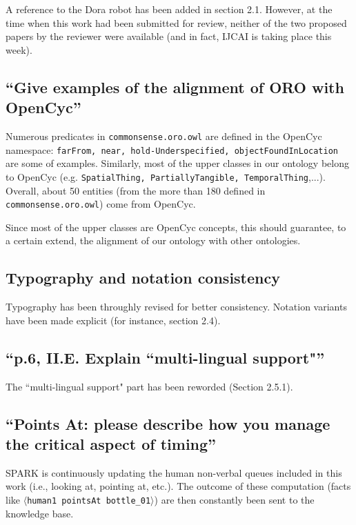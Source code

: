\documentclass[11pt]{article}
\begin{document}
A reference to the Dora robot has been added in section 2.1. However, at the
time when this work had been submitted for review, neither of the two proposed
papers by the reviewer were available (and in fact, IJCAI is taking place this
week).

\subsection{``Give examples of the alignment of ORO with OpenCyc''}

Numerous predicates in {\tt commonsense.oro.owl} are defined in the OpenCyc
namespace: {\tt farFrom, near, hold-Underspecified, objectFoundInLocation} are
some of examples. Similarly, most of the upper classes in our ontology belong
to OpenCyc (e.g. {\tt SpatialThing, PartiallyTangible, TemporalThing},...).
Overall, about 50 entities (from the more than 180 defined in {\tt
commonsense.oro.owl}) come from OpenCyc.

Since most of the upper classes are OpenCyc concepts, this should 
guarantee, to a certain extend, the alignment of our ontology with other ontologies.

\subsection{Typography and notation consistency}

Typography has been throughly revised for better consistency. Notation variants have been
made explicit (for instance, section 2.4).

\subsection{``p.6, II.E. Explain ``multi-lingual support"''}

The ``multi-lingual support" part has been reworded (Section 2.5.1).

\subsection{``Points At: please describe how you manage the critical aspect of
timing''}

SPARK is continuously updating the human non-verbal queues included in this
work (i.e., looking at, pointing at, etc.). The outcome of these computation
(facts like {\tt $\langle$human1 pointsAt bottle\_01$\rangle$}) are then
constantly been sent to the knowledge base.
\end{document}
